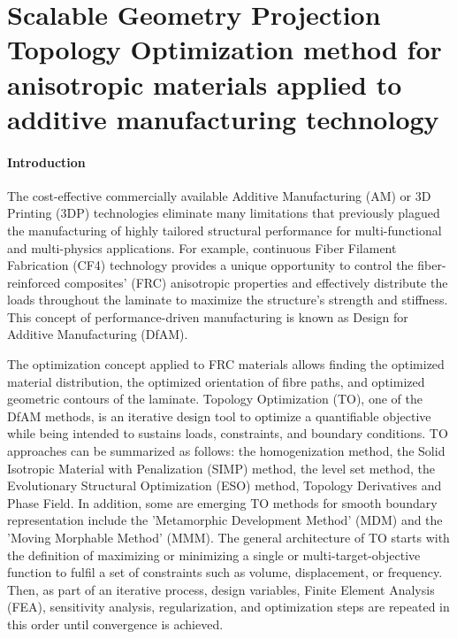 \section*{Scalable Geometry Projection Topology Optimization method for anisotropic materials applied to additive manufacturing technology}

\paragraph{Introduction}The cost-effective commercially available Additive Manufacturing (AM) or 3D Printing (3DP) technologies eliminate many limitations that previously plagued the manufacturing of highly tailored structural performance for multi-functional and multi-physics applications. For example, continuous Fiber Filament Fabrication (CF4) technology provides a unique opportunity to control the fiber-reinforced composites' (FRC) anisotropic properties and effectively distribute the loads throughout the laminate to maximize the structure's strength and stiffness. This concept of performance-driven manufacturing is known as Design for Additive Manufacturing (DfAM). 

The optimization concept applied to FRC materials allows finding the optimized material distribution, the optimized orientation of fibre paths, and optimized geometric contours of the laminate. Topology Optimization (TO), one of the DfAM methods, is an iterative design tool to optimize a quantifiable objective while being intended to sustains loads, constraints, and boundary conditions. TO approaches can be summarized as follows: the homogenization method, the Solid Isotropic Material with Penalization (SIMP) method, the level set method, the Evolutionary Structural Optimization (ESO) method, Topology Derivatives and Phase Field. In addition, some are emerging TO methods for smooth boundary representation include the 'Metamorphic Development Method' (MDM) and the 'Moving Morphable Method' (MMM). The general architecture of TO starts with the definition of maximizing or minimizing a single or multi-target-objective function to fulfil a set of constraints such as volume, displacement, or frequency. Then, as part of an iterative process, design variables, Finite Element Analysis (FEA), sensitivity analysis, regularization, and optimization steps are repeated in this order until convergence is achieved.


